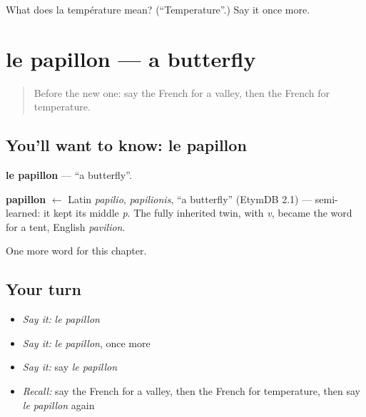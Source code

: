 \begin{tcolorbox}[breakable,colback=teal!4,colframe=teal!35!black,title={Before you move on}]
What does la température mean? (\textquotedblleft{}Temperature\textquotedblright{}.) Say it once more.
\end{tcolorbox}
\section[le papillon]{le papillon — a butterfly}

\label{lesson:FR-C194-papillon}



\begin{quote}
Before the new one: say the French for a valley, then the French for temperature.
\end{quote}

\subsection*{You'll want to know: le papillon}
\textbf{le papillon} — \textquotedblleft{}a butterfly\textquotedblright{}.

\begin{cousinweb}
\textbf{papillon} $\leftarrow$ Latin \emph{papilio}, \emph{papilionis}, \textquotedblleft{}a butterfly\textquotedblright{} (EtymDB 2.1) — semi-learned: it kept its middle \emph{p}. The fully inherited twin, with \emph{v}, became the word for a tent, English \emph{pavilion}.
\end{cousinweb}

\begin{grammarlens}[title={What you've built}]
One more word for this chapter.
\end{grammarlens}

\subsection*{Your turn}
\begin{itemize}
\raggedright
  \item \emph{Say it:} \emph{le papillon}
  \item \emph{Say it:} \emph{le papillon}, once more
  \item \emph{Say it:} say \emph{le papillon}
  \item \emph{Recall:} say the French for a valley, then the French for temperature, then say \emph{le papillon} again
\end{itemize}


